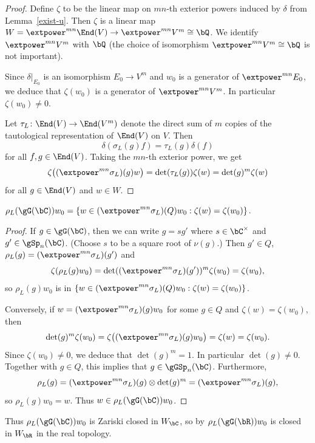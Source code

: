 \begin{proof}
Define $\zeta$ to be the linear map on $mn$-th exterior powers induced by $\delta$ from Lemma~\ref{exist-u}.
Then $\zeta$ is a linear map $W = \extpower^{mn} \End(V) \to \extpower^{mn} V^m \cong \bQ$.
We identify $\extpower^{mn} V^m$ with $\bQ$ (the choice of isomorphism $\extpower^{mn} V^m \cong \bQ$ is not important).

Since $\delta|_{E_0}$ is an isomorphism $E_0 \to V^m$ and $w_0$ is a generator of $\extpower^{mn} E_0$, we deduce that $\zeta(w_0)$ is a generator of $\extpower^{mn} V^m$.
In particular $\zeta(w_0) \neq 0$.

Let $\tau_L \colon \End(V) \to \End(V^m)$ denote the direct sum of $m$ copies of the tautological representation of $\End(V)$ on $V$.
Then
\[
\delta(\sigma_L(g)f) = \tau_L(g)\delta(f)
\]
for all $f, g \in \End(V)$.
Taking the $mn$-th exterior power, we get
\[
\zeta \bigl( (\extpower^{mn} \sigma_L)(g)w \bigr) = \det(\tau_L(g)) \zeta(w) = \det(g)^m \zeta(w)
\]
for all $g \in \End(V)$ and $w \in W$.
\end{proof}

\begin{lemma}
$\rho_L(\gG(\bC))w_0 = \{ w \in (\extpower^{mn} \sigma_L)(Q)w_0 : \zeta(w) = \zeta(w_0) \}$.
\end{lemma}

\begin{proof}
If $g \in \gG(\bC)$, then we can write $g = s g'$ where $s \in \bC^\times$ and $g' \in \gSp_n(\bC)$. (Choose $s$ to be a square root of $\nu(g)$.)
Then $g' \in Q$, $\rho_L(g) = (\extpower^{mn} \sigma_L)(g')$ and
\[
\zeta(\rho_L(g)w_0) = \det((\extpower^{mn} \sigma_L)(g'))^m \zeta(w_0) = \zeta(w_0),
\]
so $\rho_L(g)w_0$ is in $\{ w \in (\extpower^{mn} \sigma_L)(Q)w_0 : \zeta(w) = \zeta(w_0) \}$.

Conversely, if $w = (\extpower^{mn} \sigma_L)(g)w_0$ for some $g \in Q$ and $\zeta(w) = \zeta(w_0)$, then
\[
\det(g)^m \zeta(w_0) = \zeta \bigl( (\extpower^{mn} \sigma_L)(g)w_0 \bigr) = \zeta(w) = \zeta(w_0).
\]
Since $\zeta(w_0) \neq 0$, we deduce that $\det(g)^m = 1$.
In particular $\det(g) \neq 0$.
Together with $g \in Q$, this implies that $g \in \gGSp_n(\bC)$.
Furthermore,
\[
\rho_L(g) = (\extpower^{mn} \sigma_L)(g) \otimes \det(g)^m = (\extpower^{mn} \sigma_L)(g),
\]
so $\rho_L(g)w_0 = w$.
Thus $w \in \rho_L(\gG(\bC))w_0$.
\end{proof}

Thus $\rho_L(\gG(\bC))w_0$ is Zariski closed in $W_\bC$, so by \cite[Prop.\,6.3]{BHC62} $\rho_L(\gG(\bR))w_0$ is closed in $W_\bR$ in the real topology.

